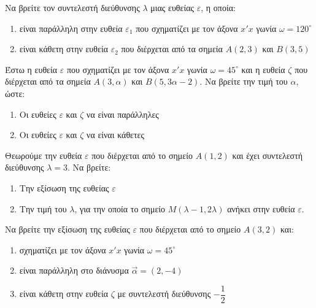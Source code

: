 \documentclass{presentation}
\begin{document}
\begin{askisi}
  Να βρείτε τον συντελεστή διεύθυνσης $λ$ μιας ευθείας $ε$, η οποία:
  \begin{enumerate}[<+->]
    \item είναι παράλληλη στην ευθεία $ε_1$ που σχηματίζει με τον άξονα $x'x$ γωνία $ω=120^{\circ}$
    \item είναι κάθετη στην ευθεία $ε_2$ που διέρχεται από τα σημεία $Α(2,3)$ και $Β(3,5)$
  \end{enumerate}
\end{askisi}

\begin{askisi}
  Έστω η ευθεία $ε$ που σχηματίζει με τον άξονα $x'x$ γωνία $ω=45^{\circ}$ και η ευθεία $ζ$ που διέρχεται από τα σημεία $Α(3,α)$ και $Β(5,3α-2)$. Να βρείτε την τιμή του $α$, ώστε:
  \begin{enumerate}[<+->]
    \item Οι ευθείες $ε$ και $ζ$ να είναι παράλληλες
    \item Οι ευθείες $ε$ και $ζ$ να είναι κάθετες
  \end{enumerate}
\end{askisi}

\begin{askisi}
  Θεωρούμε την ευθεία $ε$ που διέρχεται από το σημείο $Α(1,2)$ και έχει συντελεστή διεύθυνσης $λ=3$. Να βρείτε:
  \begin{enumerate}[<+->]
    \item Την εξίσωση της ευθείας $ε$
    \item Την τιμή του $λ$, για την οποία το σημείο $Μ(λ-1,2λ)$ ανήκει στην ευθεία $ε$.
  \end{enumerate}
\end{askisi}

\begin{askisi}
  Να βρείτε την εξίσωση της ευθείας $ε$ που διέρχεται από το σημείο $Α(3,2)$ και:
  \begin{enumerate}[<+->]
    \item σχηματίζει με τον άξονα $x'x$ γωνία $ω=45^{\circ}$
    \item είναι παράλληλη στο διάνυσμα $\vec{α}=(2,-4)$
    \item είναι κάθετη στην ευθεία $ζ$ με συντελεστή διεύθυνσης $-\dfrac{1}{2}$
  \end{enumerate}
\end{askisi}
\end{document}
